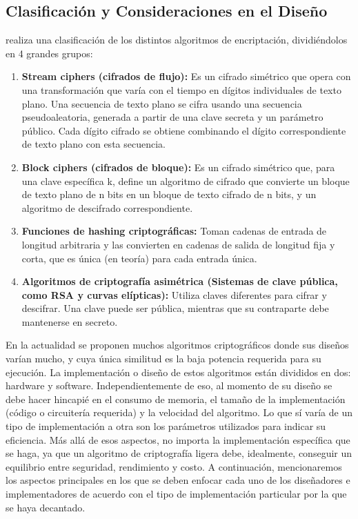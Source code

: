 \documentclass[a4paper,10pt]{article}
\begin{document}
	\subsection{Clasificación y Consideraciones en el Diseño}
	\textcite{wehbe2022criptografia} realiza una clasificación de los distintos algoritmos de encriptación, dividiéndolos en 4 grandes grupos:
	\begin{enumerate}
		\item \textbf{Stream ciphers (cifrados de flujo): }Es un cifrado simétrico que opera con una transformación que varía con el tiempo en dígitos individuales de texto plano. Una secuencia de texto plano se cifra usando una secuencia pseudoaleatoria, generada a partir de una clave secreta y un parámetro público. Cada dígito cifrado se obtiene combinando el dígito correspondiente de texto plano con esta secuencia.
		\item \textbf{Block ciphers (cifrados de bloque):} Es un cifrado simétrico que, para una clave específica k, define un algoritmo de cifrado que convierte un bloque de texto plano de n bits en un bloque de texto cifrado de n bits, y un algoritmo de descifrado correspondiente.
		\item \textbf{Funciones de hashing criptográficas: }Toman cadenas de entrada de longitud arbitraria y las convierten en cadenas de salida de longitud fija y corta, que es única (en teoría) para cada entrada única.
		\item \textbf{Algoritmos de criptografía asimétrica (Sistemas de clave pública, como RSA y curvas elípticas): }Utiliza claves diferentes para cifrar y descifrar. Una clave puede ser pública, mientras que su contraparte debe mantenerse en secreto.
	\end{enumerate}
	En la actualidad se proponen muchos algoritmos criptográficos donde sus diseños varían mucho, y cuya única similitud es la baja potencia requerida para su ejecución. La implementación o diseño de estos algoritmos están divididos en dos: hardware y software. Independientemente de eso, al momento de su diseño se debe hacer hincapié en el consumo de memoria, el tamaño de la implementación (código o circuitería requerida) y la velocidad del algoritmo. Lo que sí varía de un tipo de implementación a otra son los parámetros utilizados para indicar su eficiencia. Más allá de esos aspectos, no importa la implementación específica que se haga, ya que un algoritmo de criptografía ligera debe, idealmente, conseguir un equilibrio entre seguridad, rendimiento y costo.
	A continuación, mencionaremos los aspectos principales en los que se deben enfocar cada uno de los diseñadores e implementadores de acuerdo con el tipo de implementación particular por la que se haya decantado.
\end{document}
